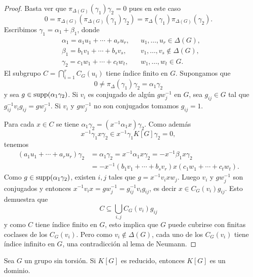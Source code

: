 \begin{proof}
	Basta ver que $\pi_{\Delta(G)}(\gamma_1)\gamma_2=0$ pues en este caso 
	\[
		0=\pi_{\Delta(G)}(\pi_{\Delta(G)}(\gamma_1)\gamma_2)=\pi_{\Delta}(\gamma_1)\pi_{\Delta(G)}(\gamma_2).
	\]
	Escribimos $\gamma_1=\alpha_1+\beta_1$, donde 
	\begin{align*}
		&\alpha_1=a_1u_1+\cdots+a_ru_r, && u_1,\dots,u_r\in\Delta(G),\\
		&\beta_1=b_1v_1+\cdots+b_sv_s, && v_1,\dots,v_s\not\in\Delta(G),\\
		&\gamma_2=c_1w_1+\cdots+c_tw_t,&& w_1,\dots,w_t\in G.
	\end{align*}
	El subgrupo $C=\bigcap_{i=1}^rC_G(u_i)$ tiene índice finito en $G$.
	Supongamos que 
	\[
		0\ne \pi_{\Delta}(\gamma_1)\gamma_2=\alpha_1\gamma_2
	\]
	y sea $g\in\operatorname{supp}(\alpha_1\gamma_2)$. 
	Si $v_i$ es conjugado de algún
	$gw_j^{-1}$ en $G$, sea $g_{ij}\in G$ tal que
	$g_{ij}^{-1}v_ig_{ij}=gw_j^{-1}$. Si $v_i$ y $gw_j^{-1}$ no son conjugados
	tomamos $g_{ij}=1$. 

	Para cada $x\in C$ se tiene $\alpha_1\gamma_2=(x^{-1}\alpha_1x)\gamma_2$. Como además 
	\[
		x^{-1}\gamma_1x\gamma_2\in x^{-1}\gamma_1K[G]\gamma_2=0,
	\]
	tenemos 
	\begin{align*}
		(a_1u_1+\cdots+a_ru_r)\gamma_2&=
		\alpha_1\gamma_2=x^{-1}\alpha_1x\gamma_2=-x^{-1}\beta_1x\gamma_2\\
		&=-x^{-1}(b_1v_1+\cdots+b_sv_r)x(c_1w_1+\cdots+c_tw_t).
	\end{align*}
	Como $g\in\operatorname{supp}(\alpha_1\gamma_2)$, existen $i,j$ tales que $g=x^{-1}v_ixw_j$.
	Luego $v_i$ y $gw_j^{-1}$ son conjugados y entonces 
	$x^{-1}v_ix=gw_j^{-1}=g_{ij}^{-1}v_ig_{ij}$, es decir $x\in C_G(v_i)g_{ij}$. Esto demuestra que
	\[
		C\subseteq\bigcup_{i,j}C_G(v_i)g_{ij}
	\]
	y como $C$ tiene índice finito en $G$, esto implica que $G$ puede cubrirse
	con finitas coclases de los $C_G(v_i)$. Pero como $v_i\not\in\Delta(G)$, cada
	uno de los $C_G(v_i)$ tiene índice infinito en $G$, una contradicción al lema
	de Neumann.
\end{proof}

\begin{theorem}
	Sea $G$ un grupo sin torsión. Si $K[G]$ es reducido, entonces $K[G]$ es un
	dominio.	
\end{theorem}

